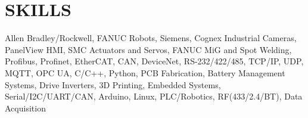 \section{SKILLS}
\begin{itemize}[leftmargin=0in, label={}]
    \small{\item{
                    Allen Bradley/Rockwell, FANUC Robots, Siemens, Cognex Industrial Cameras, PanelView HMI, SMC Actuators and Servos, FANUC MiG and Spot Welding, Profibus, Profinet, EtherCAT, CAN, DeviceNet, RS-232/422/485, TCP/IP, UDP, MQTT, OPC UA, C/C++, Python, PCB Fabrication, Battery Management Systems, Drive Inverters, 3D Printing, Embedded Systems, Serial/I2C/UART/CAN, Arduino, Linux, PLC/Robotics, RF(433/2.4/BT), Data Acquisition
              }}
\end{itemize}
